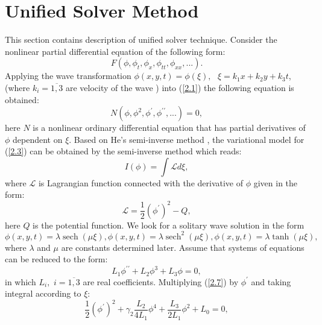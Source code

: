 \documentclass[12pt]{llncs}
\DeclareMathOperator{\sech}{sech}
\begin{document}
\section{Unified Solver Method}
\quad This section contains description of unified solver technique\cite{volkan}.
Consider the nonlinear partial differential equation of the following form:
\begin{equation}\label{2.1}
	F\left( \phi,\phi_{t},\phi_{x},\phi_{tt},\phi_{xx},...\right).
\end{equation}
Applying the wave transformation $\phi\left( x,y,t\right) =\phi\left( \xi \right),\text{ }\xi =k_1x+k_2y+k_3t$, (where  $k_i=\overline{1,3}$ are velocity of the  wave ) into (\ref{2.1}) the following equation is obtained:
\begin{equation}\label{2.3}
	N\left( \phi,\phi^{2},\phi^{\prime },\phi^{\prime \prime },...\right) =0,
\end{equation}
here $N$ is  a nonlinear ordinary differential equation that has partial derivatives of $\phi$ dependent on $\xi$.  Based on He's semi-inverse method \cite{He:1997,He:2006,N.Kudryashov:2009},  the variational model for (\ref{2.3}) can be obtained by the semi-inverse method \cite{N.Kudryashov:2009} which reads:%
\begin{equation}
	I(\phi)=\int \mathcal{L}d\xi ,
\end{equation}
where $\mathcal{L}$ is  Lagrangian function connected with the derivative of $\phi$ given in the form:
\begin{equation}
	\mathcal{L}=\frac{1}{2}\left( \phi^{\prime }\right) ^{2}-Q,
\end{equation}
here $Q$ is the potential function. 
We look for a solitary wave solution in the form%
\begin{equation}\label{2.6}
	\phi\left( x,y,t\right) =\lambda  \sech\left( \mu\xi \right) ,\phi\left( x,y,t\right)
	=\lambda \sech^{2}\left( \mu\xi \right) ,\phi\left( x,y,t\right) =\lambda
	\tanh\left( \mu \xi \right),
\end{equation}
where $\lambda 
$ and $\mu $ are constants determined later.
Assume that systems of equations can be reduced to the form:%
\begin{equation}\label{2.7}
	L_{1}\phi^{\prime \prime }+L_{2}\phi^{3}+L_{3}\phi=0,
\end{equation}%
in which $L_{i},$ $i=\overline{1,3}$ are real coefficients. Multiplying (\ref{2.7}) by $%
\phi^{\prime }$ and taking integral according to $\xi$:%
\begin{equation}\label{2.8}
	\frac{1}{2}\left( \phi^{\prime }\right) ^{2}+\gamma _{2}\frac{L_{2}}{4L_{1}}
	\phi^{4}+\frac{L_{3}}{2L_{1}}\phi^{2}+L_{0}=0,
\end{equation}%
\end{document}
